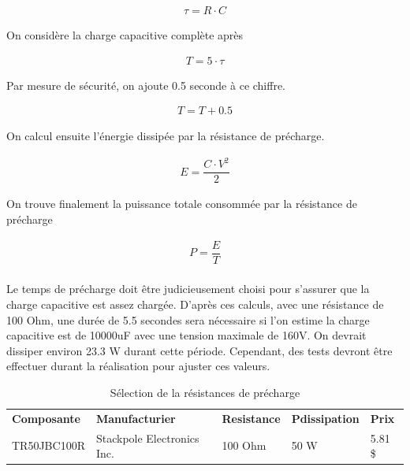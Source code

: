 		\begin{align}
			\tau =R \cdot C
			\label{eq:Constante de temps}
		\end{align}
				
		On considère la charge capacitive complète après	
	 
		\begin{align}
			T = 5 \cdot \tau
			\label{eq:CapaciteCharge}
		\end{align}
		
		Par mesure de sécurité, on ajoute 0.5 seconde à ce chiffre.
		
		\begin{align}
			T = T + 0.5
			\label{eq:Tempsdecharge}
		\end{align}		
				
		On calcul ensuite l'énergie dissipée par la résistance de précharge.
		
		\begin{align}
			E = \dfrac{C \cdot V^2}{2}
			\label{eq:EnergiePrecharge}
		\end{align}
		
		On trouve finalement la puissance totale consommée par la résistance de précharge
	
		\begin{align}
			P = \dfrac{E}{T}
			\label{eq:PuissancePrecharge}
		\end{align}	
			
		\paragraph*{}		
		Le temps de précharge doit être judicieusement choisi pour s'assurer que la charge capacitive est assez chargée. D'après ces calculs, avec une résistance de 100 Ohm, une durée de 5.5 secondes sera nécessaire si l'on estime la charge capacitive est de 10000uF avec une tension maximale de 160V. On devrait dissiper environ 23.3 W durant cette période. Cependant, des tests devront être effectuer durant la réalisation pour ajuster ces valeurs.
				
		\begin{table}[H]
			\centering
			\caption{Sélection de la résistances de précharge}
			\label{ResistancePrecharge}
			\begin{tabular}{|p{3cm}|p{5cm}|p{2cm}|p{2cm}|p{1.5cm}|}
				\hline
				\textbf{Composante} & \textbf{Manufacturier} & \textbf{Resistance} & \textbf{Pdissipation} & \textbf{Prix}
				\\ \hhline{|=|=|=|=|=|}
				TR50JBC100R & Stackpole Electronics Inc. & 100 Ohm & 50 W & 5.81 \$ \\ \hline		
			\end{tabular}
		\end{table}

